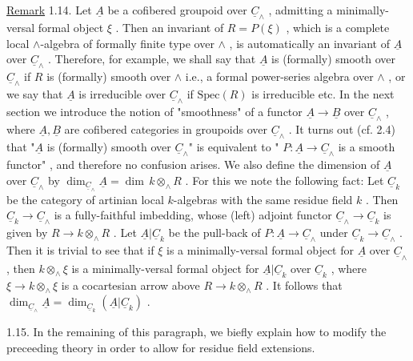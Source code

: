 \underline{Remark} 1.14.  Let  $\underline{A}$  be a cofibered groupoid over  $\underline{C}_\wedge$  , admitting a minimally-versal formal object  $\xi$  . Then an invariant of  $R = P(\xi)$  , which is a complete local  $\wedge$-algebra of formally finite type over  $\wedge$  , is automatically an invariant of  $\underline{A}$  over  $\underline{C}_\wedge$  . Therefore, for example, we shall say that  $\underline{A}$  is (formally) smooth over  $\underline{C}_\wedge$  if  $R$  is (formally) smooth over  $\wedge$  i.e., a formal power-series algebra over  $\wedge$  , or we say that  $\underline{A}$  is irreducible over  $\underline{C}_\wedge$  if  $\mathrm{Spec}(R)$  is irreducible etc. In the next section we introduce the notion of  "smoothness"  of a functor  $\underline{A} \to \underline{B}$  over  $\underline{C}_\wedge$  , where  $\underline{A}, \underline{B}$  are cofibered categories in groupoids over  $\underline{C}_\wedge$  . It turns out (cf. 2.4) that  "$\underline{A}$  is (formally) smooth over  $\underline{C}_\wedge$"  is equivalent to  " $P : \underline{A} \to \underline{C}_\wedge$  is a smooth functor"  , and therefore no confusion arises. We also define the dimension of  $\underline{A}$  over  $\underline{C}_\wedge$  by  $\dim_{\underline{C}_\wedge} \underline{A} = \dim\, k \otimes_\wedge R$  . For this we note the following fact:  Let  $\underline{C}_k$  be the category of artinian local $k$-algebras with the same residue field  $k$  . Then  $\underline{C}_k \to \underline{C}_\wedge$  is a fully-faithful imbedding, whose (left) adjoint functor  $\underline{C}_\wedge \to \underline{C}_k$  is given by  $R \to k \otimes_\wedge R$  . Let $\underline{A}|\underline{C}_k$  be the pull-back of  $P : \underline{A} \to \underline{C}_\wedge$  under  $\underline{C}_k \to \underline{C}_\wedge$  . Then it is trivial to see that if  $\xi$  is a minimally-versal formal object for  $\underline{A}$  over  $\underline{C}_\wedge$  , then  $k \otimes_\wedge \xi$ is a minimally-versal formal object for  $\underline{A}|\underline{C}_k$  over  $\underline{C}_k$  , where  $\xi \to k \otimes_\wedge \xi$  is a cocartesian arrow above  $R \to k \otimes_\wedge R$  . It follows that  $\dim_{\underline{C}_\wedge} \underline{A} = \dim_{\underline{C}_k} (\underline{A}|\underline{C}_k)$  .



1.15.  In the remaining of this paragraph, we biefly explain how to modify the preceeding theory in order to allow for residue field extensions.

